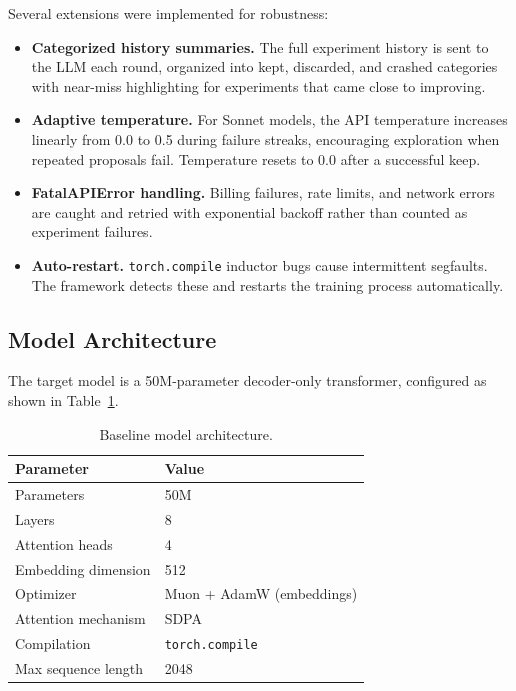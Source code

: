 \documentclass[11pt]{article}
\begin{document}
Several extensions were implemented for robustness:

\begin{itemize}[leftmargin=*]
    \item \textbf{Categorized history summaries.} The full experiment history is sent to the LLM each round, organized into kept, discarded, and crashed categories with near-miss highlighting for experiments that came close to improving.
    \item \textbf{Adaptive temperature.} For Sonnet models, the API temperature increases linearly from 0.0 to 0.5 during failure streaks, encouraging exploration when repeated proposals fail. Temperature resets to 0.0 after a successful keep.
    \item \textbf{FatalAPIError handling.} Billing failures, rate limits, and network errors are caught and retried with exponential backoff rather than counted as experiment failures.
    \item \textbf{Auto-restart.} \texttt{torch.compile} inductor bugs cause intermittent segfaults. The framework detects these and restarts the training process automatically.
\end{itemize}

\subsection{Model Architecture}
\label{sec:architecture}

The target model is a 50M-parameter decoder-only transformer, configured as shown in Table~\ref{tab:architecture}.

\begin{table}[H]
\centering
\caption{Baseline model architecture.}
\label{tab:architecture}
\begin{tabular}{ll}
\toprule
\textbf{Parameter} & \textbf{Value} \\
\midrule
Parameters & 50M \\
Layers & 8 \\
Attention heads & 4 \\
Embedding dimension & 512 \\
Optimizer & Muon + AdamW (embeddings) \\
Attention mechanism & SDPA \\
Compilation & \texttt{torch.compile} \\
Max sequence length & 2048 \\
\bottomrule
\end{tabular}
\end{table}
\end{document}
